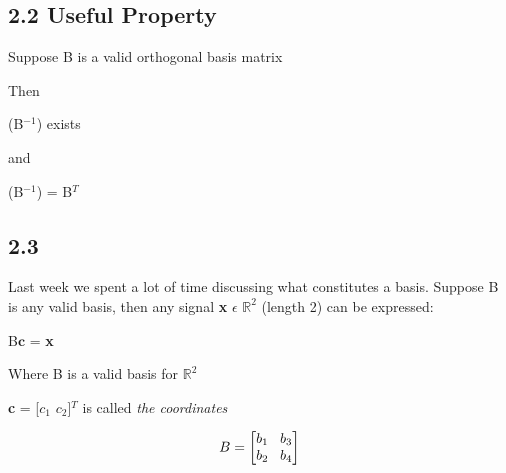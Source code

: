 \documentclass[11pt]{article}
\begin{document}
\vspace{5mm}

\subsection*{2.2 \hspace{3mm} Useful Property}
Suppose B is a valid orthogonal basis matrix

\vspace{3mm}
Then
\begin{center}

 (B$^{-1}$) exists

\end{center}
and
\begin{center}

 (B$^{-1}$) = B$^{T}$

\end{center}



\vspace{5mm}

\subsection*{2.3}
Last week we spent a lot of time discussing what constitutes a basis. Suppose B is any valid basis, then any signal \textbf{x} $\epsilon$ $\mathbb{R}^{2}$ (length 2) can be expressed:

\vspace{3mm}
\begin{center}

B$\textbf{c}$ = \textbf{x}

\end{center}
\vspace{3mm}
\begin{center}
Where B is a valid basis for $\mathbb{R}^{2}$
\end{center}
\begin{center}
\textbf{c} = [$c_1$ $c_2$]$^{T}$ is called \emph{the coordinates}
\end{center}

\begin{center}
\[
B = 
\begin{bmatrix}
   b_1  \hspace{3mm}   b_3 \\
   b_2 \hspace{3mm}   b_4            
\end{bmatrix}
\]
\end{center}
\end{document}
